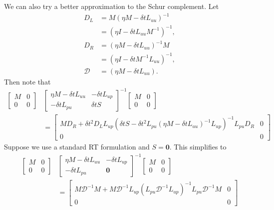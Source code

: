 \documentclass[a4paper,10pt]{article}
\begin{document}
We can also try a better approximation to the Schur complement. Let
%
\begin{align*}
D_L & = M(\eta M - \delta tL_{uu})^{-1} \\
& = (\eta I - \delta tL_{uu}M^{-1})^{-1}, \\
D_R & = (\eta M - \delta tL_{uu})^{-1}M \\
& = (\eta I - \delta tM^{-1}L_{uu})^{-1}, \\
\mathcal{D} & =(\eta M - \delta tL_{uu}).  
\end{align*}
%
Then note that
%
\begin{align*}
\begin{bmatrix} M & 0 \\ 0 & 0 \end{bmatrix}& 
	\begin{bmatrix} \eta M - \delta tL_{uu} & -\delta tL_{up} \\ -\delta tL_{pu} & \delta tS
	\end{bmatrix}^{-1}
	\begin{bmatrix} M & 0 \\ 0 & 0 \end{bmatrix} \\
& = \begin{bmatrix} MD_R + \delta t^2D_LL_{up}
	(\delta tS - \delta t^2L_{pu}(\eta M - \delta tL_{uu})^{-1}L_{up})^{-1}
		L_{pu}D_R & 0 \\ 0 & 0 \end{bmatrix}
\end{align*}
% 
Suppose we use a standard RT formulation and $S = \mathbf{0}$. This simplifies to
%
\begin{align*}
\begin{bmatrix} M & 0 \\ 0 & 0 \end{bmatrix}& 
	\begin{bmatrix} \eta M - \delta tL_{uu} & -\delta tL_{up} \\ -\delta tL_{pu} & \mathbf{0}
	\end{bmatrix}^{-1}
	\begin{bmatrix} M & 0 \\ 0 & 0 \end{bmatrix} \\
& = \begin{bmatrix} M\mathcal{D}^{-1}M + M\mathcal{D}^{-1}L_{up}
	(L_{pu}\mathcal{D}^{-1}L_{up})^{-1}
		L_{pu}\mathcal{D}^{-1}M & 0 \\ 0 & 0 \end{bmatrix}
\end{align*}
% 
\end{document}
